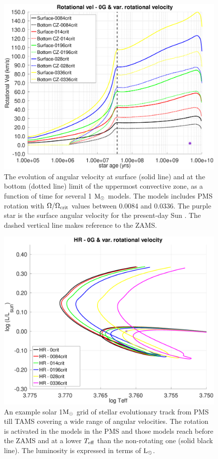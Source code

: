 \documentclass[fleqn,usenatbib]{mnras}
\begin{document}
\begin{figure}
	\includegraphics[trim = 10mm 10mm 15mm 10mm clip,width=\columnwidth]{figures/paper1/rot_vel_var_vel_0_0g.eps}
    \caption{The evolution of angular velocity at surface (solid line) and at the bottom (dotted line) limit of the uppermost convective zone, as a function of time for several 1 $\mathrm{M}_\odot$ models. The models includes PMS rotation with $\Omega / \Omega_{\mathrm{crit}}$ values between 0.0084 and 0.0336. The purple star is the surface angular velocity for the present-day Sun \citep{Gill2012}. The dashed vertical line makes reference to the ZAMS.}
    \label{fig:rot_vel_0g}
\end{figure}


\begin{figure}
	\includegraphics[trim = 10mm 10mm 15mm 10mm, clip,width=\columnwidth]{figures/paper1/hr_var_vel_0_0g_z1.eps}
    \caption{An example solar 1$\mathrm{M}_\odot$ grid of stellar evolutionary track from PMS till TAMS covering a wide range of angular velocities. The rotation is activated in the models in the PMS and those models reach before the ZAMS and at a lower $T_{\mathrm{eff}}$ than the non-rotating one (solid black line). The luminosity is expressed in terms of $\mathrm{L}_\odot$.}
    \label{fig:hr_var_vel_0g}
\end{figure}
\end{document}
